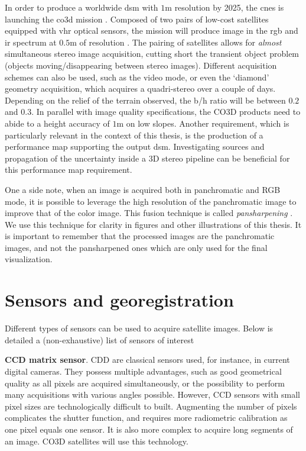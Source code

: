 In order to produce a worldwide \acrshort{dsm} with $1$m resolution by 2025, the \acrfull{cnes} is launching the \acrfull{co3d} mission \cite{melet_co3d_2020}. Composed of two pairs of low-cost satellites equipped with \acrshort{vhr} optical sensors, the mission will produce image in the \acrshort{rgb} and \acrshort{ir} spectrum at $0.5$m of resolution \cite{lebegue_co3d_2020}. The pairing of satellites allows for \textit{almost} simultaneous stereo image acquisition, cutting short the transient object problem (\ie objects moving/disappearing between stereo images). Different acquisition schemes can also be used, such as the video mode, or even the `diamond' geometry acquisition, which acquires a quadri-stereo over a couple of days. Depending on the relief of the terrain observed, the \acrshort{b/h} ratio will be between $0.2$ and $0.3$. In parallel with image quality specifications, the CO3D products need to abide to a height accuracy of $1$m on low slopes. Another requirement, which is particularly relevant in the context of this thesis, is the production of a performance map supporting the output \acrshort{dsm}. Investigating sources and propagation of the uncertainty inside a 3D stereo pipeline can be beneficial for this performance map requirement. 



One a side note, when an image is acquired both in panchromatic and RGB mode, it is possible to leverage the high resolution of the panchromatic image to improve that of the color image. This fusion technique is called \textit{pansharpening} \cite{loncan_hyperspectral_2015}. We use this technique for clarity in figures and other illustrations of this thesis. It is important to remember that the processed images are the panchromatic images, and not the pansharpened ones which are only used for the final visualization.

\section{Sensors and georegistration}
Different types of sensors can be used to acquire satellite images. Below is detailed a (non-exhaustive) list of sensors of interest \cite{cnes_imagerie_2008}

\textbf{CCD matrix sensor}. CDD are classical sensors used, for instance, in current digital cameras. They possess multiple advantages, such as good geometrical quality as all pixels are acquired simultaneously, or the possibility to perform many acquisitions with various angles possible. However, CCD sensors with small pixel sizes are technologically difficult to built. Augmenting the number of pixels complicates the shutter function, and requires more radiometric calibration as one pixel equals one sensor. It is also more complex to acquire long segments of an image. CO3D satellites will use this technology.

